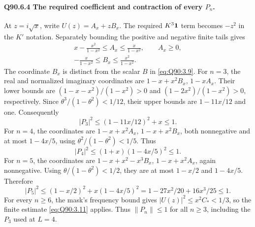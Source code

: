 \paragraph{Q90.6.4 The required coefficient and contraction of every \(P_n\).}
At \(z=\allowbreak i\sqrt x\), write \(U(z)=\allowbreak A_x+zB_x\).
The required \(K^3\mathbf1\) term becomes \(-z^2\) in the \(K'\) notation.
Separately bounding the positive and negative finite tails gives
\begin{equation}\tag{Q90.6.10}\label{eq:Q90:6.10}
\begin{gathered}
x-\frac{x^2}{1-x^2}\le A_x\le\frac{x}{1-x^2},\qquad A_x\ge0,\\
-\frac{x}{1-x^2}\le B_x\le\frac{x^2}{1-x^2}.
\end{gathered}
\end{equation}
The coordinate \(B_x\) is distinct from the scalar \(B\) in
\eqref{eq:Q90:3.9}.
For \(n=\allowbreak 3\), the real and normalized imaginary coordinates are
\(1-x+x^2B_x\), \(1-xA_x\). Their lower bounds are
\((1-x-x^2)/(1-x^2)>\allowbreak 0\) and
\((1-2x^2)/(1-x^2)>\allowbreak 0\), respectively.
Since \(\theta^3/(1-\theta^2)<\allowbreak 1/12\), their upper bounds are
\(1-11x/12\) and one. Consequently
\begin{equation}\tag{Q90.6.11}\label{eq:Q90:6.11}
|P_3|^2\le(1-11x/12)^2+x\le1.
\end{equation}
For \(n=\allowbreak 4\), the coordinates are \(1-x+x^2A_x\), \(1-x+x^2B_x\),
both nonnegative and at most \(1-4x/5\), using
\(\theta^2/(1-\theta^2)<\allowbreak 1/5\). Thus
\begin{equation}\tag{Q90.6.12}\label{eq:Q90:6.12}
|P_4|^2\le(1+x)(1-4x/5)^2\le1.
\end{equation}
For \(n=\allowbreak 5\), the coordinates are
\(1-x+x^2-x^3B_x\), \(1-x+x^2A_x\), again nonnegative.
Using \(\theta/(1-\theta^2)<\allowbreak 1/2\), they are at most
\(1-x/2\) and \(1-4x/5\). Therefore
\begin{equation}\tag{Q90.6.13}\label{eq:Q90:6.13}
|P_5|^2\le(1-x/2)^2+x(1-4x/5)^2
=1-27x^2/20+16x^3/25\le1.
\end{equation}
For every \(n\ge\allowbreak 6\), the mask's frequency bound gives
\(|U(z)|^2\le\allowbreak  x^2C_*<\allowbreak 1/3\), so the finite estimate
\eqref{eq:Q90:3.11} applies. Thus \(\|P_n\|\le\allowbreak 1\) for all
\(n\ge\allowbreak 3\), including the \(P_3\) used at \(L=\allowbreak 4\).

